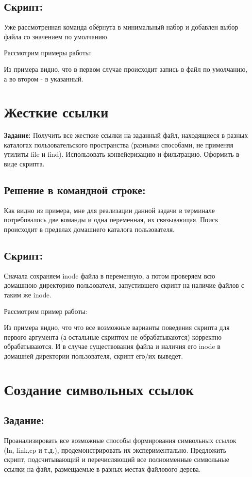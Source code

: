\documentclass[a4paper]{article}
\begin{document}
\subsection{Скрипт:}

Уже рассмотренная команда обёрнута в минимальный набор и добавлен выбор файла со значением по умолчанию.

Рассмотрим примеры работы:

Из примера видно, что в первом случае происходит запись в файл по умолчанию, а во втором - в указанный.
\section{Жесткие ссылки} \textbf{Задание:} Получить все жесткие ссылки на заданный файл, находящиеся в разных каталогах пользовательского пространства (разными способами, не применяя утилиты file и find). Использовать конвейеризацию и фильтрацию. Оформить в виде скрипта. 

\subsection{Решение в командной строке:}

Как видно из примера, мне для реализации данной задачи в терминале потребовалось две команды и одна переменная, их связывающая. Поиск происходит в пределах домашнего каталога пользователя.

\subsection{Скрипт:}

Сначала сохраняем inode файла в переменную, а потом проверяем всю домашнюю директорию пользователя, запустившего скрипт на наличие файлов с таким же inode.

Рассмотрим пример работы:

Из примера видно, что что все возможные варианты поведения скрипта для первого аргумента (а остальные скриптом не обрабатываются) корректно обрабатываются. И в случае существования файла и наличия его inode в домашней директории пользователя, скрипт его/их выведет.
\section{Создание символьных ссылок}
\subsection{Задание:} Проанализировать все возможные способы формирования символьных ссылок (ln, link,cp и т.д.), продемонстрировать их экспериментально. Предложить скрипт, подсчитывающий и перечисляющий все полноименные символьные ссылки на файл, размещаемые в разных местах файлового дерева.
\end{document}

